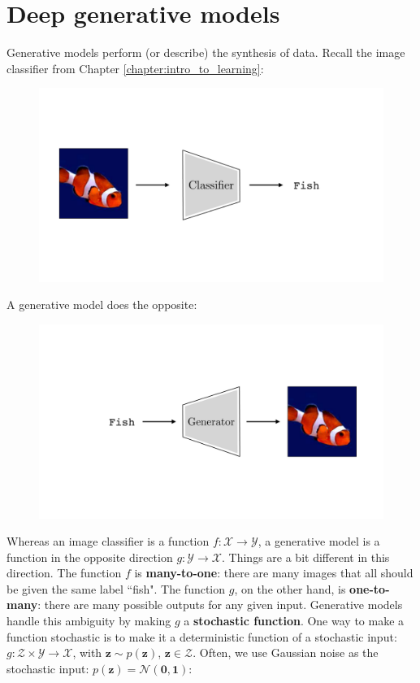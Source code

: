 
\chapter{Deep generative models}\label{chapter:generative_models}

Generative models perform (or describe) the synthesis of data. Recall the image classifier from Chapter \ref{chapter:intro_to_learning}:

\begin{figure}[h]
    \centering
    \includegraphics[width=0.7\linewidth]{./figures/generative_models/image_classification.pdf}
    \label{fig:gen_models_image_classification}
\end{figure}

A generative model does the opposite:

\begin{figure}[h]
    \centering
    \hspace*{0.0\linewidth}\includegraphics[width=0.7\linewidth]{./figures/generative_models/image_generation.pdf}
    \label{fig:gen_models_image_generation}
\end{figure}

Whereas an image classifier is a function $f: \mathcal{X} \rightarrow \mathcal{Y}$, a generative model is a function in the opposite direction $g: \mathcal{Y} \rightarrow \mathcal{X}$. Things are a bit different in this direction. The function $f$ is {\bf many-to-one}: there are many images that all should be given the same label ``fish". The function $g$, on the other hand, is {\bf one-to-many}: there are many possible outputs for any given input. Generative models handle this ambiguity by making $g$ a {\bf stochastic function}. One way to make a function stochastic is to make it a deterministic function of a stochastic input: $g: \mathcal{Z} \times \mathcal{Y} \rightarrow \mathcal{X}$, with $\mathbf{z} \sim p(\mathbf{z})$, $\mathbf{z} \in \mathcal{Z}$. Often, we use Gaussian noise as the stochastic input: $p(\mathbf{z}) = \mathcal{N}(\mathbf{0},\mathbf{1})$:

